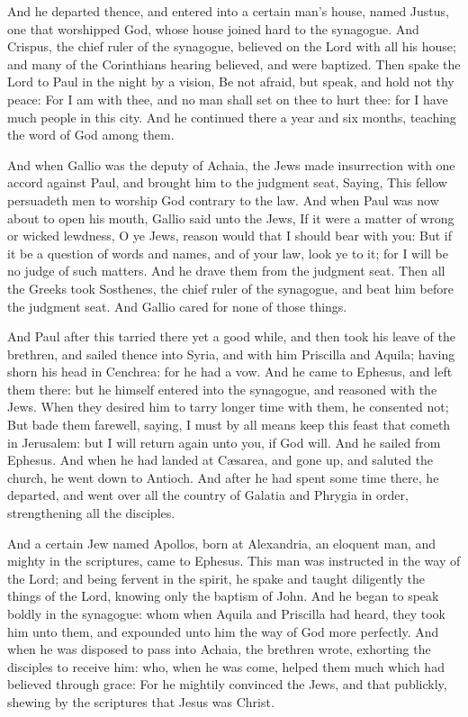 And he departed thence, and entered into a certain man's
house, named Justus, one that worshipped God, whose house joined hard to
the synagogue.  And Crispus, the chief ruler of the
synagogue, believed on the Lord with all his house; and many of the
Corinthians hearing believed, and were baptized.  Then spake
the Lord to Paul in the night by a vision, Be not afraid, but speak, and
hold not thy peace:  For I am with thee, and no man shall
set on thee to hurt thee: for I have much people in this city.
 And he continued there a year and six months, teaching the
word of God among them.

 And when Gallio was the deputy of Achaia, the Jews made
insurrection with one accord against Paul, and brought him to the
judgment seat,  Saying, This fellow persuadeth men to
worship God contrary to the law.  And when Paul was now
about to open his mouth, Gallio said unto the Jews, If it were a matter
of wrong or wicked lewdness, O ye Jews, reason would that I should bear
with you:  But if it be a question of words and names, and
of your law, look ye to it; for I will be no judge of such matters.
 And he drave them from the judgment seat. 
Then all the Greeks took Sosthenes, the chief ruler of the synagogue,
and beat him before the judgment seat. And Gallio cared for none of
those things.

 And Paul after this tarried there yet a good while, and
then took his leave of the brethren, and sailed thence into Syria, and
with him Priscilla and Aquila; having shorn his head in Cenchrea: for he
had a vow.  And he came to Ephesus, and left them there:
but he himself entered into the synagogue, and reasoned with the Jews.
 When they desired him to tarry longer time with them, he
consented not;  But bade them farewell, saying, I must by
all means keep this feast that cometh in Jerusalem: but I will return
again unto you, if God will. And he sailed from Ephesus. 
And when he had landed at Cæsarea, and gone up, and saluted the church,
he went down to Antioch.  And after he had spent some time
there, he departed, and went over all the country of Galatia and Phrygia
in order, strengthening all the disciples.

 And a certain Jew named Apollos, born at Alexandria, an
eloquent man, and mighty in the scriptures, came to Ephesus.
 This man was instructed in the way of the Lord; and being
fervent in the spirit, he spake and taught diligently the things of the
Lord, knowing only the baptism of John.  And he began to
speak boldly in the synagogue: whom when Aquila and Priscilla had heard,
they took him unto them, and expounded unto him the way of God more
perfectly.  And when he was disposed to pass into Achaia,
the brethren wrote, exhorting the disciples to receive him: who, when he
was come, helped them much which had believed through grace:
 For he mightily convinced the Jews, and that publickly,
shewing by the scriptures that Jesus was Christ.

